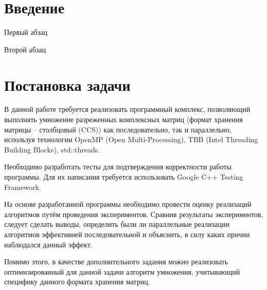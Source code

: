 \documentclass{report}
\begin{document}
	\setcounter{page}{2}


	\tableofcontents
	\newpage


	\section*{Введение}
		\par Первый абзац
		\par Второй абзац
	\newpage


	\section*{Постановка задачи}
		\par В данной работе требуется реализовать программный комплекс, позволяющий выполнять умножение разреженных комплексных матриц (формат хранения матрицы – столбцовый (CCS)) как последовательно, так и параллельно, используя технологии OpenMP (Open Multi-Processing), TBB (Intel Threading Building Blocks), std::threads.
		\par Необходимо разработать тесты для подтверждения корректности работы программы. Для их написания требуется использовать Google C++ Testing Framework.
		\par На основе разработанной программы необходимо провести оценку реализаций алгоритмов путём проведения экспериментов. Сравнив результаты экспериментов, следует сделать выводы, определить были ли параллельные реализации алгоритмов эффективней последовательной и объяснить, в силу каких причин наблюдался данный эффект.
		\par Помимо этого, в качестве дополнительного задания можно реализовать оптимизированный для данной задачи алгоритм умножения, учитывающий специфику данного формата хранения матриц. 
	\newpage


\end{document}
